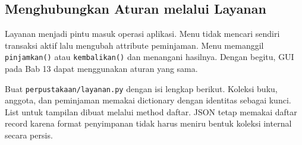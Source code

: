 \subsection{Menghubungkan Aturan melalui Layanan}

Layanan menjadi pintu masuk operasi aplikasi. Menu tidak mencari sendiri transaksi aktif lalu mengubah attribute peminjaman. Menu memanggil \texttt{pinjamkan()} atau \texttt{kembalikan()} dan menangani hasilnya. Dengan begitu, GUI pada Bab 13 dapat menggunakan aturan yang sama.

Buat \texttt{perpustakaan/layanan.py} dengan isi lengkap berikut. Koleksi buku, anggota, dan peminjaman memakai dictionary dengan identitas sebagai kunci. List untuk tampilan dibuat melalui method daftar. JSON tetap memakai daftar record karena format penyimpanan tidak harus meniru bentuk koleksi internal secara persis.

